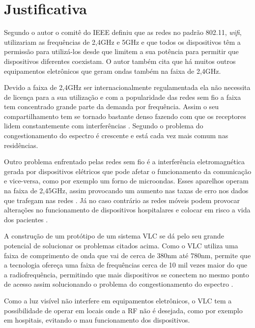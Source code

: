 \chapter{Justificativa}

Segundo o autor  o comitê do IEEE definiu que as redes no padrão 802.11, \textit{wifi}, utilizariam as frequências de 2,4GHz e 5GHz e que todos os dispositivos têm a permissão para utilizá-los desde que limitem a sua potência para permitir que dispositivos diferentes coexistam. O autor  também cita que há muitos outros equipamentos eletrônicos que geram ondas também na faixa de 2,4GHz. 

Devido a faixa de 2,4GHz ser internacionalmente regulamentada ela não necessita de licença para a sua utilização e com a popularidade das redes sem fio a faixa tem concentrado grande parte da demanda por frequência. Assim o seu compartilhamento tem se tornado bastante denso fazendo com que os receptores lidem constantemente com interferências \cite{barros}. Segundo  o problema do congestionamento do espectro é crescente e está cada vez mais comum nas residências.

Outro problema enfrentado pelas redes sem fio é a interferência eletromagnética gerada por dispositivos elétricos que pode afetar o funcionamento da comunicação e vice-versa, como por exemplo um forno de microondas. Esses aparelhos operam na faixa de 2,45GHz, assim provocando um aumento nas taxas de erro nos dados que trafegam nas redes \cite{barros}. Já no caso contrário as redes móveis podem provocar alterações no funcionamento de dispositivos hospitalares e colocar em risco a vida dos pacientes \cite{cabral}.

A construção de um protótipo de um sistema VLC se dá pelo seu grande potencial de solucionar os problemas citados acima. Como o VLC utiliza uma faixa de comprimento de onda que vai de cerca de 380nm até 780nm, permite que a tecnologia ofereça uma faixa de frequências cerca de 10 mil vezes maior do que a radiofrequência, permitindo que mais dispositivos se conectem no mesmo ponto de acesso assim solucionando o problema do congestionamento do espectro \cite{conceiccao2015comunicaccao}. 

Como a luz visível não interfere em equipamentos eletrônicos, o VLC tem a possibilidade de operar  em locais onde a RF não é desejada, como por exemplo em hospitais, evitando o mau funcionamento dos dispositivos.

